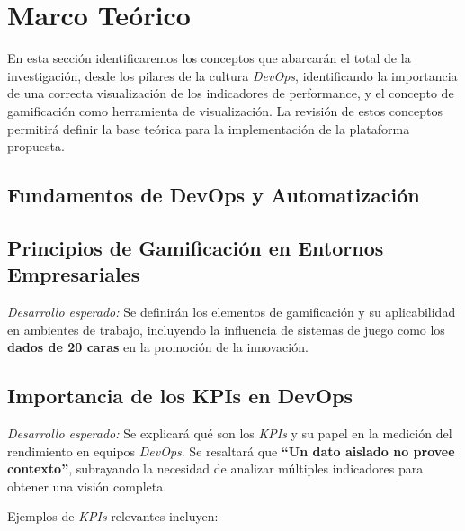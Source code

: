 \documentclass[journal]{IEEEtran}
\begin{document}
\section{\textbf{\Large Marco Teórico}}

En esta sección identificaremos los conceptos que abarcarán el total de la investigación, desde los pilares de la cultura \textit{DevOps}, identificando la importancia de una correcta visualización de los indicadores de performance, y el concepto de gamificación como herramienta de visualización. La revisión de estos conceptos permitirá definir la base teórica para la implementación de la plataforma propuesta.

\subsection{\textbf{Fundamentos de DevOps y Automatización}}



\subsection{\textbf{Principios de Gamificación en Entornos Empresariales}}

\textit{Desarrollo esperado:} Se definirán los elementos de gamificación y su aplicabilidad en ambientes de trabajo, incluyendo la influencia de sistemas de juego como los \textbf{dados de 20 caras} en la promoción de la innovación.

\subsection{\textbf{Importancia de los KPIs en DevOps}}

\textit{Desarrollo esperado:} Se explicará qué son los \textit{KPIs} y su papel en la medición del rendimiento en equipos \textit{DevOps}. Se resaltará que \textbf{``Un dato aislado no provee contexto''}, subrayando la necesidad de analizar múltiples indicadores para obtener una visión completa.

Ejemplos de \textit{KPIs} relevantes incluyen:
\end{document}

